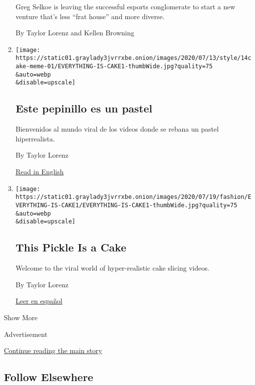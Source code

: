 \begin{enumerate}
  Greg Selkoe is leaving the successful esports conglomerate to start a
  new venture that's less ``frat house'' and more diverse.

  By Taylor Lorenz and Kellen Browning
\item
  \href{/es/2020/07/14/espanol/estilos-de-vida/pastel-realista-meme.html}{}

  \texttt{[image: https://static01.graylady3jvrrxbe.onion/images/2020/07/13/style/14cake-meme-01/EVERYTHING-IS-CAKE1-thumbWide.jpg?quality=75\\\&auto=webp\\\&disable=upscale]}

  \hypertarget{este-pepinillo-es-un-pastel}{%
  \subsection{Este pepinillo es un
  pastel}\label{este-pepinillo-es-un-pastel}}

  Bienvenidos al mundo viral de los videos donde se rebana un pastel
  hiperrealista.

  By Taylor Lorenz

  \href{https://www.nytimes3xbfgragh.onion/2020/07/14/style/what-is-the-cake-meme.html}{Read
  in English}
\item
  \href{/2020/07/14/style/what-is-the-cake-meme.html}{}

  \texttt{[image: https://static01.graylady3jvrrxbe.onion/images/2020/07/19/fashion/EVERYTHING-IS-CAKE1/EVERYTHING-IS-CAKE1-thumbWide.jpg?quality=75\\\&auto=webp\\\&disable=upscale]}

  \hypertarget{this-pickle-is-a-cake}{%
  \subsection{This Pickle Is a Cake}\label{this-pickle-is-a-cake}}

  Welcome to the viral world of hyper-realistic cake slicing videos.

  By Taylor Lorenz

  \href{https://www.nytimes3xbfgragh.onion/es/2020/07/14/espanol/estilos-de-vida/pastel-realista-meme.html}{Leer
  en español}
\end{enumerate}

Show More

Advertisement

\protect\hyperlink{after-mid2}{Continue reading the main story}

\hypertarget{follow-elsewhere}{%
\subsection{Follow Elsewhere}\label{follow-elsewhere}}

